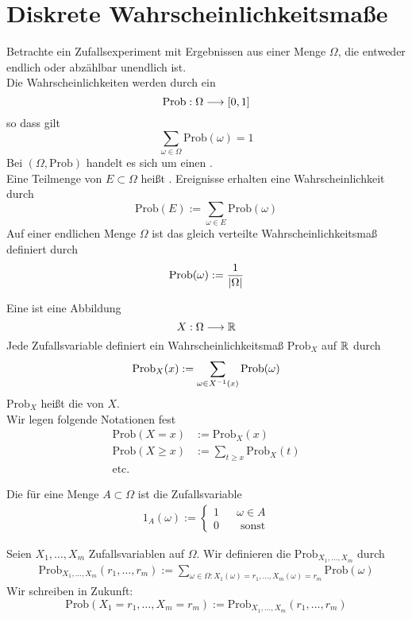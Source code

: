 \renewcommand{\P}{\text{Prob}}
\section{Diskrete Wahrscheinlichkeitsmaße}
Betrachte ein Zufallsexperiment mit Ergebnissen aus einer Menge $\Omega$, die entweder endlich oder abzählbar unendlich ist.\\
Die Wahrscheinlichkeiten werden durch ein 
\[ \P : \Omega \Pfeil{} [0,1] \]
so dass gilt
\[ \sum_{\omega \in \Omega} \P(\omega) = 1 \]
Bei $(\Omega, \P)$ handelt es sich um einen .\\
Eine Teilmenge von $E\subset \Omega$ heißt . Ereignisse erhalten eine Wahrscheinlichkeit durch
\[ \P(E) := \sum_{\omega \in E} \P(\omega) \]
Auf einer endlichen Menge $\Omega$ ist das gleich verteilte Wahrscheinlichkeitsmaß definiert durch
\[ \P(\omega) := \frac{1}{\bet{\Omega}} \]

\Def{}
Eine  ist eine Abbildung
\[ X : \Omega \overset{}{\longrightarrow} \mathbb{R} \]
Jede Zufallsvariable definiert ein Wahrscheinlichkeitsmaß $\P_X$ auf $\mathbb{R}$ durch
\[ \P_X(x) := \sum_{\omega \in X\i(x)} \P(\omega) \]
$\P_X$ heißt die  von $X$.\\
Wir legen folgende Notationen fest
\begin{align*}
\P(X = x) &:= \P_X(x)\\
\P(X \geq x) &:= \sum_{t \geq x}\P_X(t)\\
\text{etc.}
\end{align*}

\Def{}
Die  für eine Menge $A \subset \Omega$ ist die Zufallsvariable
\begin{align*}
1_A (\omega) := \left\lbrace
\begin{aligned}
1 && \omega \in A\\
0 && \text{ sonst}
\end{aligned}
\right.
\end{align*}

Seien $X_1,\ldots, X_m$ Zufallsvariablen auf $\Omega$. Wir definieren die  $\P_{X_1,\ldots, X_m}$ durch
\begin{align*}
\P_{X_1,\ldots, X_m}(r_1,\ldots, r_m) := \sum_{\omega \in \Omega: X_1(\omega) = r_1, \ldots, X_m(\omega) = r_m}\P(\omega)
\end{align*}
Wir schreiben in Zukunft:
\[ \P(X_1 = r_1, \ldots, X_m = r_m) := \P_{X_1,\ldots, X_m}(r_1,\ldots, r_m) \]

